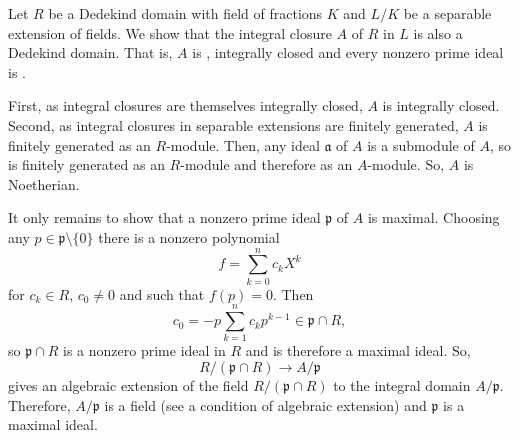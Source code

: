 \documentclass[12pt]{article}
\begin{document}
Let $R$ be a Dedekind domain with field of fractions $K$ and $L/K$ be a  separable extension of fields. We show that the integral closure $A$ of $R$ in $L$ is also a Dedekind domain. That is, $A$ is , integrally closed and every nonzero prime ideal is .

First, as integral closures are themselves integrally closed, $A$ is integrally closed. Second, as integral closures in separable extensions are finitely generated, $A$ is finitely generated as an $R$-module. Then, any ideal $\mathfrak{a}$ of $A$ is a submodule of $A$, so is finitely generated as an $R$-module and therefore as an $A$-module. So, $A$ is Noetherian.

It only remains to show that a nonzero prime ideal $\mathfrak{p}$ of $A$ is maximal. Choosing any $p\in\mathfrak{p}\setminus\{0\}$ there is a nonzero polynomial
\begin{equation*}
f=\sum_{k=0}^{n}c_kX^k
\end{equation*}
for $c_k\in R$, $c_0\not=0$ and such that $f(p)=0$. Then
\begin{equation*}
c_0=-p\sum_{k=1}^{n}c_kp^{k-1}\in\mathfrak{p}\cap R,
\end{equation*}
so $\mathfrak{p}\cap R$ is a nonzero prime ideal in $R$ and is therefore a maximal ideal. So,
\begin{equation*}
R/(\mathfrak{p}\cap R)\rightarrow A/\mathfrak{p}
\end{equation*}
gives an algebraic extension of the field $R/(\mathfrak{p}\cap R)$ to the integral domain $A/\mathfrak{p}$. Therefore, $A/\mathfrak{p}$ is a field (see a condition of algebraic extension) and $\mathfrak{p}$ is a maximal ideal.
\end{document}
